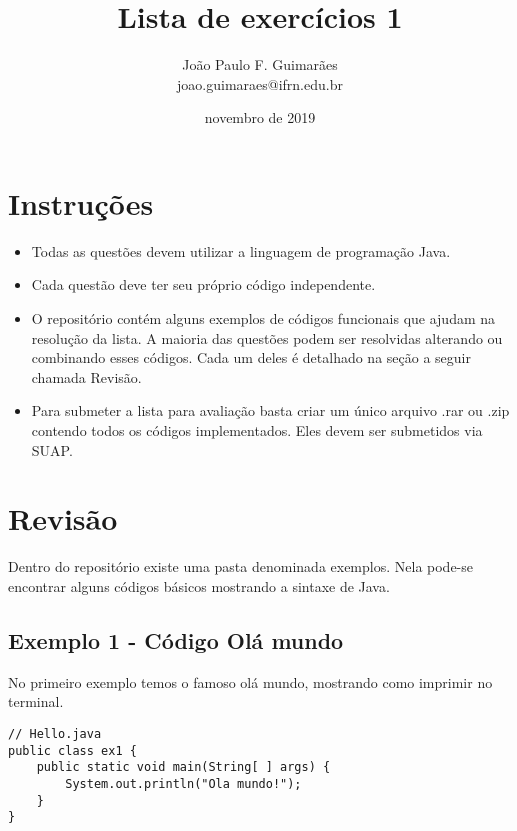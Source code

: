 \documentclass[12pt]{article}
\begin{document}
 

\title{Lista de exercícios 1} 
\author{João Paulo F. Guimarães \\ joao.guimaraes@ifrn.edu.br} 
\date{novembro de 2019} 

\maketitle %

\section{Instruções}

\begin{itemize}

  \item Todas as questões devem utilizar a linguagem de programação Java.

  \item Cada questão deve ter seu próprio código independente.

  \item O repositório contém alguns exemplos de códigos funcionais que ajudam na resolução da lista. A maioria das questões podem ser resolvidas alterando ou combinando esses códigos. Cada um deles é detalhado na seção a seguir chamada Revisão.

  \item Para submeter a lista para avaliação basta criar um único arquivo .rar ou .zip contendo todos os códigos implementados. Eles devem ser submetidos via SUAP.
  \end{itemize}


\section{Revisão}

Dentro do repositório existe uma pasta denominada exemplos. Nela pode-se encontrar alguns códigos básicos mostrando a sintaxe de Java.

\subsection{Exemplo 1 - Código Olá mundo}

No primeiro exemplo temos o famoso olá mundo, mostrando como imprimir no terminal.

\begin{lstlisting}
// Hello.java
public class ex1 {
	public static void main(String[ ] args) {
        System.out.println("Ola mundo!");
    }
}
\end{lstlisting}
\end{document}

